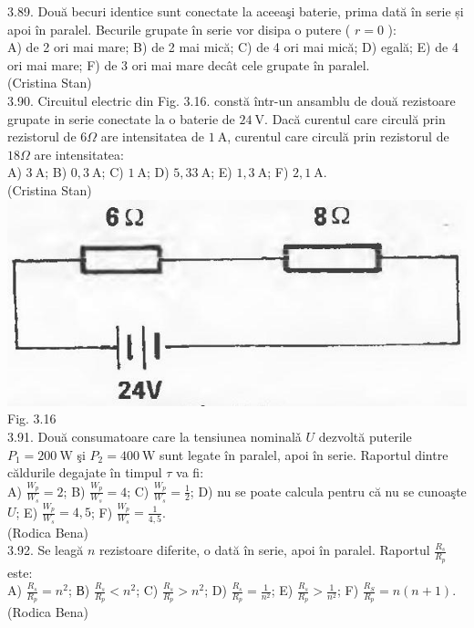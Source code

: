 \documentclass[10pt]{article}
\begin{document}
3.89. Două becuri identice sunt conectate la aceeaşi baterie, prima dată în serie și apoi în paralel. Becurile grupate în serie vor disipa o putere ( $r=0$ ):\\ A) de 2 ori mai mare; B) de 2 mai mică; C) de 4 ori mai mică; D) egală; E) de 4 ori mai mare; F) de 3 ori mai mare decât cele grupate în paralel.\\ (Cristina Stan)\\

3.90. Circuitul electric din Fig. 3.16. constă într-un ansamblu de două rezistoare grupate in serie conectate la o baterie de $24 \mathrm{~V}$. Dacă curentul care circulă prin rezistorul de $6 \Omega$ are intensitatea de $1 \mathrm{~A}$, curentul care circulă prin rezistorul de $18 \Omega$ are intensitatea:\\ A) $3 \mathrm{~A}$; B) $0,3 \mathrm{~A}$; C) $1 \mathrm{~A}$; D) $5,33 \mathrm{~A}$; E) $1,3 \mathrm{~A}$; F) $2,1 \mathrm{~A}$.\\ (Cristina Stan)\\ \includegraphics[max width=\textwidth, center]{2025_07_01_5b3ff9fa0d508c8e9f17g-163} Fig. 3.16\\

3.91. Două consumatoare care la tensiunea nominalǎ $U$ dezvoltă puterile $P_{1}=200 \mathrm{~W}$ şi $P_{2}=400 \mathrm{~W}$ sunt legate în paralel, apoi în serie. Raportul dintre căldurile degajate în timpul $\tau$ va fi:\\ A) $\frac{W_{p}}{W_{s}}=2$; B) $\frac{W_{p}}{W_{s}}=4$; C) $\frac{W_{p}}{W_{s}}=\frac{1}{2}$; D) nu se poate calcula pentru că nu se cunoaşte $U$; E) $\frac{W_{p}}{W_{s}}=4,5$; F) $\frac{W_{p}}{W_{s}}=\frac{1}{4,5}$.\\ (Rodica Bena)\\

3.92. Se leagă $n$ rezistoare diferite, o dată în serie, apoi în paralel. Raportul $\frac{R_{s}}{R_{p}}$ este:\\ A) $\frac{R_{s}}{R_{p}}=n^{2}$; В) $\frac{R_{s}}{R_{p}}<n^{2}$; C) $\frac{R_{s}}{R_{p}}>n^{2}$; D) $\frac{R_{s}}{R_{p}}=\frac{1}{n^{2}}$; E) $\frac{R_{s}}{R_{p}}>\frac{1}{n^{2}}$; F) $\frac{R_{S}}{R_{p}}=n(n+1)$.\\ (Rodica Bena)\\
\end{document}
